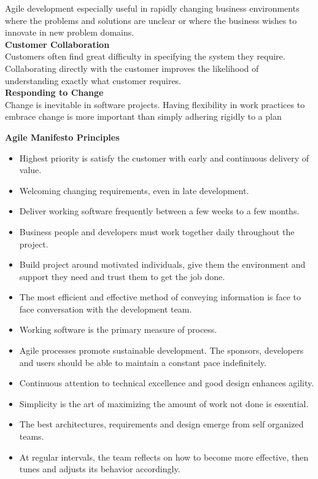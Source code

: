 \documentclass[12pt,a4paper,violet]{bbe}
\begin{document}
	  Agile development especially useful in rapidly changing business environments where the problems and solutions are unclear or where the business wishes to innovate in new problem domains.\\
	  \textbf{Customer Collaboration} \\
	  Customers often find great difficulty in specifying the system they require. Collaborating directly with the customer  improves the likelihood of understanding exactly what customer requires. \\	 
	  \textbf{Responding to Change} \\
	  Change is inevitable in software projects. Having flexibility in work practices to embrace change is more important than simply adhering rigidly to a plan \\	
	  \begin{remark}
	      \textbf{Agile Manifesto Principles} \\
	      \begin{itemize}
	          \item Highest priority is satisfy the customer with early and continuous delivery of value.
	          \item Welcoming changing requirements, even in late development.
	          \item Deliver working software frequently between a few weeks to a few months.
	          \item Business people and developers must work together daily throughout the project.
	          \item Build project around motivated individuals, give them the environment and support they need and trust them to get the job done.
	          \item The most efficient and effective method of conveying information is face to face conversation with the development team.
	          \item Working software is the primary measure of process.
	          \item Agile processes promote sustainable development. The sponsors, developers and users should be able to maintain a constant pace indefinitely.
	          \item Continuous attention to technical excellence  and good design enhances agility.
	          \item Simplicity is the art of maximizing the amount of work not done is essential.
	          \item The best architectures, requirements and design emerge from self organized teams.
	          \item At regular intervals, the team reflects on how to become more effective, then tunes and adjusts its behavior accordingly.
	      \end{itemize}
	  \end{remark}
	
\end{document}
